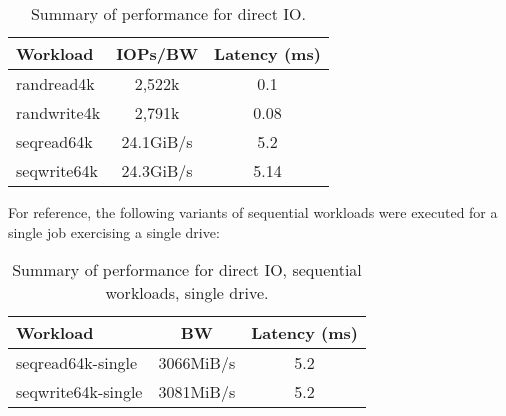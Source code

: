 \begin{table}[h!]
\centering
\begin{tabular}[t]{|l*{2}{|c|}}
   \hline
   \textbf{Workload} & \textbf{IOPs/BW} & \textbf{Latency (ms)} \\
   \hline
   randread4k & 2,522k & 0.1 \\
   randwrite4k & 2,791k & 0.08 \\
   seqread64k & 24.1GiB/s  & 5.2 \\
   seqwrite64k & 24.3GiB/s & 5.14 \\
   \hline
\end{tabular}
\caption{Summary of performance for direct IO.}
\label{table:rawio}
\end{table}

For reference, the following variants of sequential workloads were executed for a single job exercising a single drive:

\begin{table}[h!]
\centering
\begin{tabular}[t]{|l*{2}{|c|}}
   \hline
   \textbf{Workload} & \textbf{BW} & \textbf{Latency (ms)} \\
   \hline
   seqread64k-single & 3066MiB/s & 5.2 \\
   seqwrite64k-single & 3081MiB/s & 5.2 \\
   \hline
\end{tabular}
\caption{Summary of performance for direct IO, sequential workloads, single drive.}
\label{table:rawio-single}
\end{table}
